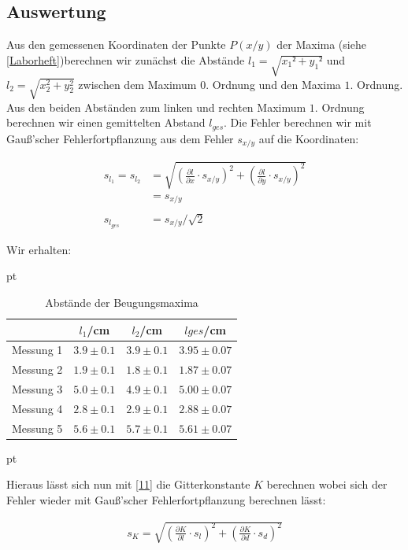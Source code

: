 \documentclass[12pt]{article}
\newcommand{\del}[2][]{\frac{\partial #1}{\partial #2}}
\begin{document}
\subsection{Auswertung}

Aus den gemessenen Koordinaten der Punkte $P(x/y)$ der Maxima (siehe \ref{Laborheft})berechnen wir zunächst die Abstände $l_1 = \sqrt{x_1²+y_1²}$ und $l_2= \sqrt{x_2^2+y_2^2} $ zwischen dem Maximum $0.$ Ordnung und den Maxima $1.$ Ordnung. Aus den beiden Abständen zum linken und rechten Maximum $1.$ Ordnung berechnen wir einen gemittelten Abstand $l_{ges}$. Die Fehler berechnen wir mit Gauß'scher Fehlerfortpflanzung aus dem Fehler $s_{x/y}$ auf die Koordinaten:

\begin{align*}
s_{l_1} = s_{l_2} &= \sqrt{\left(\del[l]{x}\cdot s_{x/y}\right)^2+\left(\del[l]{y}\cdot s_{x/y}\right)^2}\\
&= s_{x/y}\\
\  \\
s_{l_{ges}} &= s_{x/y}/\sqrt{2}
\end{align*}

Wir erhalten:

  pt
 \begin{table}[h!]
 {\centering{}
\begin{tabular}{c||c|c|c}
 					& $l_1$/cm 	& $l_2$/cm & $l{ges}$/cm	\\ \hline\hline
Messung 1		& $3.9 \pm 0.1$ 	&  $3.9 \pm 0.1$    	&  $3.95 \pm 0.07$ \\ \hline 
Messung 2	&	 $1.9 \pm 0.1$ 	   	&  $1.8 \pm 0.1$  	&  $1.87 \pm 0.07$  \\ \hline
Messung 3      	&  $5.0 \pm 0.1$  	&  $4.9 \pm 0.1$  &  $5.00 \pm 0.07$  \\ \hline
Messung 4    & $2.8 \pm 0.1$ & $2.9 \pm 0.1$ &   $2.88 \pm 0.07$        \\ \hline                                           
Messung 5  & $5.6 \pm 0.1$  & $5.7 \pm 0.1$ & $5.61 \pm 0.07$
 \end{tabular}
 \caption{Abstände der Beugungsmaxima}}
\end{table}
 pt

Hieraus lässt sich nun mit \ref{11} die Gitterkonstante $K$ berechnen wobei sich der Fehler wieder mit Gauß'scher Fehlerfortpflanzung berechnen lässt:

\begin{align*}
s_K = \sqrt{\left(\del[K]{l}\cdot s_{l}\right)^2+\left(\del[K]{d}\cdot s_{d}\right)^2}
\end{align*}
\end{document}
